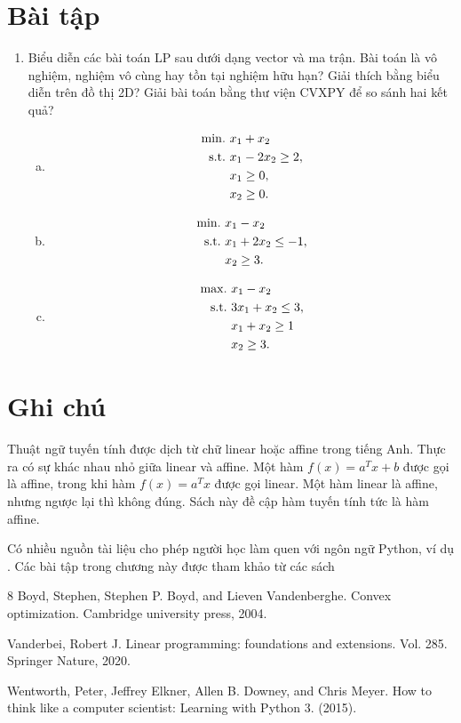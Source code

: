 \documentclass{book}
\begin{document}
\section{Bài tập}
\begin{enumerate}
\item Biểu diễn các bài toán LP sau dưới dạng vector và ma trận. Bài toán là vô nghiệm, nghiệm vô cùng hay tồn tại nghiệm hữu hạn? Giải thích bằng biểu diễn trên đồ thị 2D? Giải bài toán bằng thư viện CVXPY để so sánh hai kết quả?
	\begin{enumerate}[a.]
	\item 
	\begin{align*}
		\rm{min.}~ & x_1+x_2 \\
		\rm{s.t.}~ & x_1-2x_2 \geq 2,\\
			&	x_1 \geq 0,\\ 
			&	x_2 \geq 0.		
	\end{align*}
	
	\item 
	\begin{align*}
		\rm{min.}~ & x_1-x_2 \\
		\rm{s.t.}~ & x_1+2x_2 \leq -1,\\
			&	x_2 \geq 3.		
	\end{align*}
	
	\item 
	\begin{align*}
		\rm{max.}~ & x_1-x_2 \\
		\rm{s.t.}~ & 3x_1+x_2 \leq 3,\\
			&	x_1+x_2 \geq 1\\	
			&	x_2 \geq 3.		
	\end{align*}
	\end{enumerate}
\end{enumerate}

\section{Ghi chú}
Thuật ngữ tuyến tính được dịch từ chữ linear hoặc affine trong tiếng Anh. Thực ra có sự khác nhau nhỏ giữa linear và affine. Một hàm $f(x) = a^Tx+b$ được gọi là affine, trong khi hàm $f(x) = a^Tx$ được gọi linear. Một hàm linear là affine, nhưng ngược lại thì không đúng. Sách này đề cập hàm tuyến tính tức là hàm affine.

Có nhiều nguồn tài liệu cho phép người học làm quen với ngôn ngữ Python, ví dụ \cite{pythonbook}.
Các bài tập trong chương này được tham khảo từ các sách \cite{Vanderbei, Boyd}

\begin{thebibliography}{8}
Boyd, Stephen, Stephen P. Boyd, and Lieven Vandenberghe. Convex optimization. Cambridge university press, 2004.

Vanderbei, Robert J. Linear programming: foundations and extensions. Vol. 285. Springer Nature, 2020.


Wentworth, Peter, Jeffrey Elkner, Allen B. Downey, and Chris Meyer. How to think like a computer scientist: Learning with Python 3. (2015).

\end{thebibliography}
\end{document}
